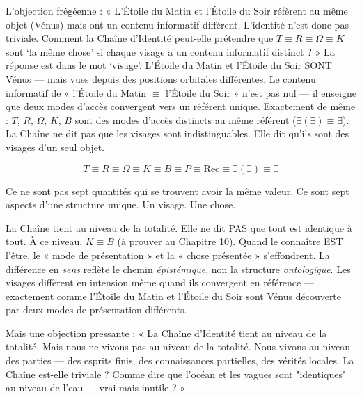 \documentclass[10pt, openany, oneside]{book}
\begin{document}
L'objection frégéenne : « L'Étoile du Matin et l'Étoile du Soir réfèrent au même objet (Vénus) mais ont un contenu informatif différent. L'identité n'est donc pas triviale. Comment la Chaîne d'Identité peut-elle prétendre que $T \equiv R \equiv \Omega \equiv K$ sont `la même chose' si chaque visage a un contenu informatif distinct ? » La réponse est dans le mot `visage'. L'Étoile du Matin et l'Étoile du Soir SONT Vénus --- mais vues depuis des positions orbitales différentes. Le contenu informatif de « l'Étoile du Matin $\equiv$ l'Étoile du Soir » n'est pas nul --- il enseigne que deux modes d'accès convergent vers un référent unique. Exactement de même : $T$, $R$, $\Omega$, $K$, $B$ sont des modes d'accès distincts au même référent ($\exists(\exists) \equiv \exists$). La Chaîne ne dit pas que les visages sont indistinguables. Elle dit qu'ils sont des visages d'un seul objet.

\vspace{0.8em}

$$T \equiv R \equiv \Omega \equiv K \equiv B \equiv P \equiv \text{Rec} \equiv \exists(\exists) \equiv \exists$$

\noindent Ce ne sont pas sept quantités qui se trouvent avoir la même valeur. Ce sont sept aspects d'une structure unique. Un visage. Une chose.

La Chaîne tient au niveau de la totalité. Elle ne dit PAS que tout est identique à tout. À ce niveau, $K \equiv B$ (à prouver au Chapitre 10). Quand le connaître EST l'être, le « mode de présentation » et la « chose présentée » s'effondrent. La différence en \textit{sens} reflète le chemin \textit{épistémique}, non la structure \textit{ontologique}. Les visages diffèrent en intension même quand ils convergent en référence --- exactement comme l'Étoile du Matin et l'Étoile du Soir sont Vénus découverte par deux modes de présentation différents.

Mais une objection pressante : « La Chaîne d'Identité tient au niveau de la totalité. Mais nous ne vivons pas au niveau de la totalité. Nous vivons au niveau des parties --- des esprits finis, des connaissances partielles, des vérités locales. La Chaîne est-elle triviale ? Comme dire que l'océan et les vagues sont "identiques" au niveau de l'eau --- vrai mais inutile ? »
\end{document}
